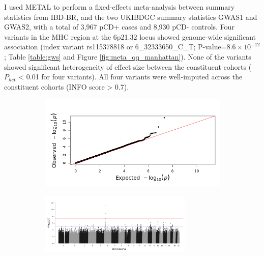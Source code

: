 I used METAL to perform a fixed-effects meta-analysis between summary statistics from IBD-BR, and the two UKIBDGC summary statistics GWAS1 and GWAS2, with a total of 3,967 pCD+ cases and 8,930 pCD- controls. 
  Four variants in the MHC region at the 6p21.32 locus showed genome-wide significant association (index variant rs115378818 or 6\_32333650\_C\_T; P-value=$8.6\times10^{-12}$; Table \ref{table:gws} and Figure \ref{fig:meta_qq_manhattan}). None of the variants showed significant heterogeneity of effect size between the constituent cohorts ($P_{het}$ < 0.01 for four variants). All four variants were well-imputed across the constituent cohorts (INFO score > 0.7).
  \begin{figure}[H]
    \centering   
    \begin{subfigure}[t]{0.8\textwidth}
      \centering   
  
      \includegraphics[width=1.0\textwidth]{Vector/ukibdgc_ibdbr_perianal_timesincediag5yrsctrl_allcase_meta_qq}
  
      
    \end{subfigure} 
  
      \begin{subfigure}[t]{1.0\textwidth}
        \centering   
  
        \includegraphics[width=0.8\textwidth]{Vector/ukibdgc_ibdbr_perianal_timesincediag5yrsctrl_allcase_meta}
  

\end{subfigure}
\end{figure}
